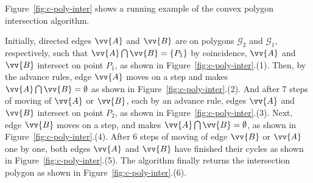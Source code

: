 \begin{example}
Figure~\ref{fig:c-poly-inter} shows a running example of the convex polygon intersection algorithm.

Initially, directed edges $\vv{A}$ and $\vv{B}$ are on polygons $\mathcal{G}_2$ and $\mathcal{G}_1$, respectively, such that $\vv{A} \bigcap \vv{B} = \{P_1\}$ by coincidence, \ie $\vv{A}$ and $\vv{B}$ intersect on point $P_1$, as shown in Figure~\ref{fig:c-poly-inter}.(1).
%
Then, by the advance rules, edge $\vv{A}$ moves on a step and makes $\vv{A} \bigcap \vv{B} = \emptyset$ as shown in Figure~\ref{fig:c-poly-inter}.(2).
And after 7 steps of moving of $\vv{A}$ or $\vv{B}$, each by an advance rule, edges $\vv{A}$ and $\vv{B}$ intersect on point $P_2$, as shown in Figure~\ref{fig:c-poly-inter}.(3).
%
Next, edge $\vv{B}$ moves on a step, and makes $\vv{A} \bigcap \vv{B} = \emptyset$, as shown in Figure~\ref{fig:c-poly-inter}.(4).
After 6 steps of moving of edge $\vv{B}$ or $\vv{A}$ one by one, both edges $\vv{A}$ and $\vv{B}$ have finished their cycles as shown in Figure~\ref{fig:c-poly-inter}.(5).
%
The algorithm finally returns the intersection polygon as shown in Figure~\ref{fig:c-poly-inter}.(6).
\end{example}








